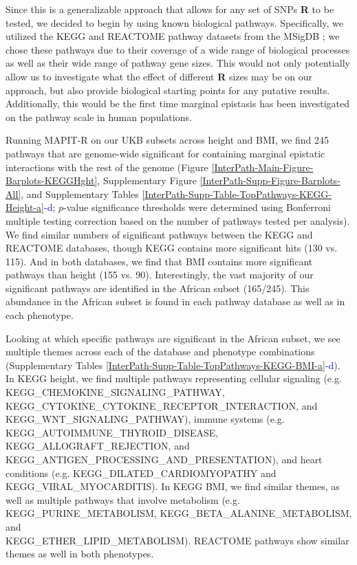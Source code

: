 \documentclass[12pt,a4paper]{article}
\begin{document}
Since this is a generalizable approach that allows for any set of SNPs \textbf{R} to be tested, we decided to begin by using known biological pathways. Specifically, we utilized the KEGG and REACTOME pathway datasets from the MSigDB \citep{Liberzon2011}; we chose these pathways due to their coverage of a wide range of biological processes as well as their wide range of pathway gene sizes. This would not only potentially allow us to investigate what the effect of different \textbf{R} sizes may be on our approach, but also provide biological starting points for any putative results. Additionally, this would be the first time marginal epistasis has been investigated on the pathway scale in human populations.

Running MAPIT-R on our UKB subsets across height and BMI, we find 245 pathways that are genome-wide significant for containing marginal epistatic interactions with the rest of the genome (Figure \ref{InterPath-Main-Figure-Barplots-KEGGHght}, Supplementary Figure \ref{InterPath-Supp-Figure-Barplots-All}, and Supplementary Tables \ref{InterPath-Supp-Table-TopPathways-KEGG-Height-a}\textcolor{blue}{-d}; $p$-value significance thresholds were determined using Bonferroni multiple testing correction based on the number of pathways tested per analysis). We find similar numbers of significant pathways between the KEGG and REACTOME databases, though KEGG contains more significant hits (130 vs. 115). And in both databases, we find that BMI contains more significant pathways than height (155 vs. 90). Interestingly, the vast majority of our significant pathways are identified in the African subset (165/245). This abundance in the African subset is found in each pathway database as well as in each phenotype.   

Looking at which specific pathways are significant in the African subset, we see multiple themes across each of the database and phenotype combinations (Supplementary Tables \ref{InterPath-Supp-Table-TopPathways-KEGG-BMI-a}\textcolor{blue}{-d}). In KEGG height, we find multiple pathways representing cellular signaling (e.g. KEGG\_CHEMOKINE\_SIGNALING\_PATHWAY, KEGG\_CYTOKINE\_CYTOKINE\_RECEPTOR\_INTERACTION, and \\ KEGG\_WNT\_SIGNALING\_PATHWAY), immune systems (e.g. \\ KEGG\_AUTOIMMUNE\_THYROID\_DISEASE, KEGG\_ALLOGRAFT\_REJECTION, and KEGG\_ANTIGEN\_PROCESSING\_AND\_PRESENTATION), and heart conditions (e.g. KEGG\_DILATED\_CARDIOMYOPATHY and \\ KEGG\_VIRAL\_MYOCARDITIS). In KEGG BMI, we find similar themes, as well as multiple pathways that involve metabolism (e.g. KEGG\_PURINE\_METABOLISM, KEGG\_BETA\_ALANINE\_METABOLISM, and \\ KEGG\_ETHER\_LIPID\_METABOLISM). REACTOME pathways show similar themes as well in both phenotypes.
\end{document}
